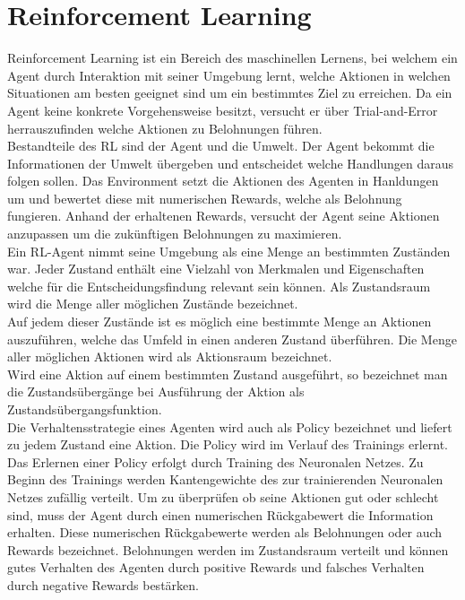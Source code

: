 \section{Reinforcement Learning}
Reinforcement Learning ist ein Bereich des maschinellen Lernens, bei welchem ein Agent durch Interaktion mit seiner Umgebung lernt, welche Aktionen in welchen Situationen am besten geeignet sind um ein bestimmtes Ziel zu erreichen. Da ein Agent keine konkrete Vorgehensweise besitzt, versucht er über Trial-and-Error herrauszufinden welche Aktionen zu Belohnungen führen. \\
Bestandteile des RL sind der Agent und die Umwelt. Der Agent bekommt die Informationen der Umwelt übergeben und entscheidet welche Handlungen daraus folgen sollen. Das Environment setzt die Aktionen des Agenten in Hanldungen um und bewertet diese mit numerischen Rewards, welche als Belohnung fungieren. Anhand der erhaltenen Rewards, versucht der Agent seine Aktionen anzupassen um die zukünftigen Belohnungen zu maximieren. \\
Ein RL-Agent nimmt seine Umgebung als eine Menge an bestimmten Zuständen war.
Jeder Zustand enthält eine Vielzahl von Merkmalen und Eigenschaften welche für die Entscheidungsfindung relevant sein können.
Als Zustandsraum wird die Menge aller möglichen Zustände bezeichnet.\\
Auf jedem dieser Zustände ist es möglich eine bestimmte Menge an Aktionen auszuführen, welche das Umfeld in einen anderen Zustand überführen.
Die Menge aller möglichen Aktionen wird als Aktionsraum bezeichnet.\\
Wird eine Aktion auf einem bestimmten Zustand ausgeführt, so bezeichnet man die Zustandsübergänge bei Ausführung der Aktion als Zustandsübergangsfunktion.\\
Die Verhaltensstrategie \pi eines Agenten wird auch als Policy bezeichnet und liefert zu jedem Zustand eine Aktion. Die Policy wird im Verlauf des Trainings erlernt.\\
Das Erlernen einer Policy erfolgt durch Training des Neuronalen Netzes. Zu Beginn des Trainings werden Kantengewichte des zur trainierenden Neuronalen Netzes zufällig verteilt. Um zu überprüfen ob seine Aktionen gut oder schlecht sind, muss der Agent durch einen numerischen Rückgabewert die Information erhalten. Diese numerischen Rückgabewerte werden als Belohnungen oder auch Rewards bezeichnet. Belohnungen werden im Zustandsraum verteilt und können gutes Verhalten des Agenten durch positive Rewards und falsches Verhalten durch negative Rewards bestärken.
